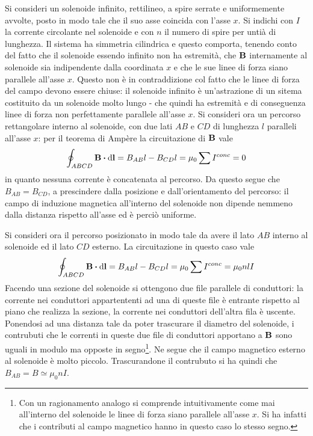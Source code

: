 \begin{example}
    Si consideri un solenoide infinito, rettilineo, a spire serrate e uniformemente avvolte, posto in modo tale
    che il suo asse coincida con l'asse $x$. Si indichi con $I$ la corrente circolante nel solenoide
    e con $n$ il numero di spire per untià di lunghezza. Il sistema ha simmetria cilindrica e questo comporta,
    tenendo conto del fatto che il solenoide essendo infinito non ha estremità, che $\vb{B}$ internamente
    al solenoide sia indipendente dalla coordinata $x$ e che le sue linee di forza siano parallele all'asse $x$.
    Questo non è in contraddizione col fatto che le linee di forza del campo devono essere chiuse: il solenoide
    infinito è un'astrazione di un sitema costituito da un solenoide molto lungo - che quindi ha estremità e
    di conseguenza linee di forza non perfettamente parallele all'asse $x$.
    Si consideri ora un percorso rettangolare interno al solenoide, con due lati $AB$ e $CD$ di lunghezza $l$ paralleli
    all'asse $x$: per il teorema di Ampère la circuitazione di $\vb{B}$ vale
    \[
        \oint_{ABCD}\vb{B} \vdot \dd{\vb{l}}=B_{AB}l-B_{CD}l=\mu_0\sum I^{conc}=0
    \]
    in quanto nessuna corrente è concatenata al percorso. Da questo segue che $B_{AB}=B_{CD}$, a prescindere dalla
    posizione e dall'orientamento del percorso: il campo di induzione magnetica all'interno del solenoide non dipende
    nemmeno dalla distanza rispetto all'asse ed è perciò uniforme.

    Si consideri ora il percorso posizionato in modo tale da avere il lato $AB$ interno al solenoide ed il lato
    $CD$ esterno. La circuitazione in questo caso vale
    \[
        \oint_{ABCD}\vb{B} \vdot \dd{\vb{l}}=B_{AB}l-B_{CD}l=\mu_0\sum I^{conc}=\mu_0 nl I
    \]
    Facendo una sezione del solenoide si ottengono due file parallele di conduttori: la corrente nei conduttori
    appartententi ad una di queste file è entrante rispetto al piano che realizza la sezione, la corrente nei
    conduttori dell'altra fila è uscente. Ponendosi ad una distanza tale da poter trascurare il diametro del
    solenoide, i contrubuti che le correnti in queste due file di conduttori apportano a $\vb{B}$ sono uguali in
    modulo ma opposte in segno\footnote{Con un ragionamento analogo si comprende intuitivamente come mai
    all'interno del solenoide le linee di forza siano parallele all'asse $x$. Si ha infatti che i contributi
    al campo magnetico hanno in questo caso lo stesso segno.}.
    Ne segue che il campo magnetico esterno al solenoide è molto piccolo. Trascurandone
    il contrubuto si ha quindi che $B_{AB}=B\simeq\mu_0 n I$.
\end{example}
